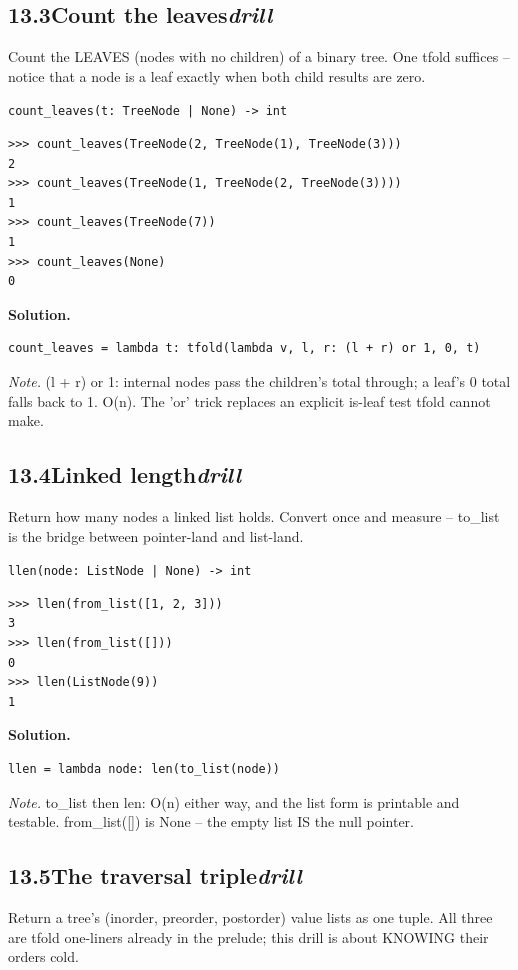 \documentclass[10pt,letterpaper]{book}
\begin{document}
\subsection*{13.3\quad Count the leaves\hfill\textnormal{\textit{drill}}}
Count the LEAVES (nodes with no children) of a binary tree. One tfold suffices -- notice that a node is a leaf exactly when both child results are zero.

\noindent\texttt{count\_leaves(t: TreeNode | None) -> int}
\begin{lstlisting}[style=ex]
>>> count_leaves(TreeNode(2, TreeNode(1), TreeNode(3)))
2
>>> count_leaves(TreeNode(1, TreeNode(2, TreeNode(3))))
1
>>> count_leaves(TreeNode(7))
1
>>> count_leaves(None)
0
\end{lstlisting}
\noindent\textbf{Solution.}
\begin{lstlisting}[style=code]
count_leaves = lambda t: tfold(lambda v, l, r: (l + r) or 1, 0, t)
\end{lstlisting}
\noindent\textit{Note.} (l + r) or 1: internal nodes pass the children's total through; a leaf's 0 total falls back to 1. O(n). The 'or' trick replaces an explicit is-leaf test tfold cannot make.

\subsection*{13.4\quad Linked length\hfill\textnormal{\textit{drill}}}
Return how many nodes a linked list holds. Convert once and measure -- to\_list is the bridge between pointer-land and list-land.

\noindent\texttt{llen(node: ListNode | None) -> int}
\begin{lstlisting}[style=ex]
>>> llen(from_list([1, 2, 3]))
3
>>> llen(from_list([]))
0
>>> llen(ListNode(9))
1
\end{lstlisting}
\noindent\textbf{Solution.}
\begin{lstlisting}[style=code]
llen = lambda node: len(to_list(node))
\end{lstlisting}
\noindent\textit{Note.} to\_list then len: O(n) either way, and the list form is printable and testable. from\_list([]) is None -- the empty list IS the null pointer.

\subsection*{13.5\quad The traversal triple\hfill\textnormal{\textit{drill}}}
Return a tree's (inorder, preorder, postorder) value lists as one tuple. All three are tfold one-liners already in the prelude; this drill is about KNOWING their orders cold.
\end{document}
